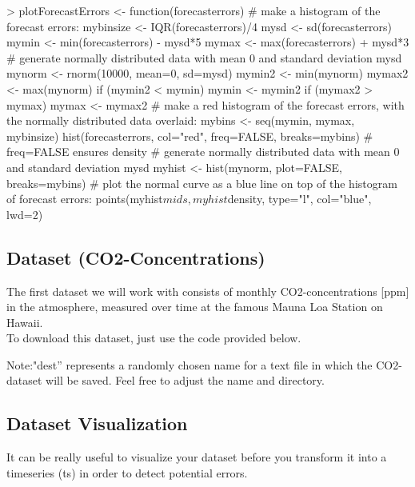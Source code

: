 \documentclass[11pt, a4paper]{article} %
\begin{document}
\begin{Schunk}
\begin{Sinput}
> plotForecastErrors <- function(forecasterrors)
 {
 # make a histogram of the forecast errors:
 mybinsize <- IQR(forecasterrors)/4
 mysd <- sd(forecasterrors)
 mymin <- min(forecasterrors) - mysd*5
 mymax <- max(forecasterrors) + mysd*3
 # generate normally distributed data with mean 0 and standard deviation mysd
 mynorm <- rnorm(10000, mean=0, sd=mysd)
 mymin2 <- min(mynorm)
 mymax2 <- max(mynorm)
 if (mymin2 < mymin) { mymin <- mymin2 }
 if (mymax2 > mymax) { mymax <- mymax2 }
 # make a red histogram of the forecast errors, with the normally distributed data overlaid:
 mybins <- seq(mymin, mymax, mybinsize)
 hist(forecasterrors, col="red", freq=FALSE, breaks=mybins)
 # freq=FALSE ensures density
 # generate normally distributed data with mean 0 and standard deviation mysd
 myhist <- hist(mynorm, plot=FALSE, breaks=mybins)
 # plot the normal curve as a blue line on top of the histogram of forecast errors:
 points(myhist$mids, myhist$density, type="l", col="blue", lwd=2)
 }
\end{Sinput}
\end{Schunk}
\subsection{Dataset (CO2-Concentrations)}%
The first dataset we will work with consists of monthly CO2-concentrations [ppm] in the atmosphere, measured over time at the famous Mauna Loa Station on Hawaii.\\
To download this dataset, just use the code provided below.
\begin{Schunk}
\end{Schunk}
\noindent Note:"dest'' represents a randomly chosen name for a text file in which the CO2-dataset will be saved. Feel free to adjust the name and directory.
\subsection{Dataset Visualization}%
It can be really useful to visualize your dataset before you transform it into a timeseries (ts) in order to detect potential errors.
\end{document}

